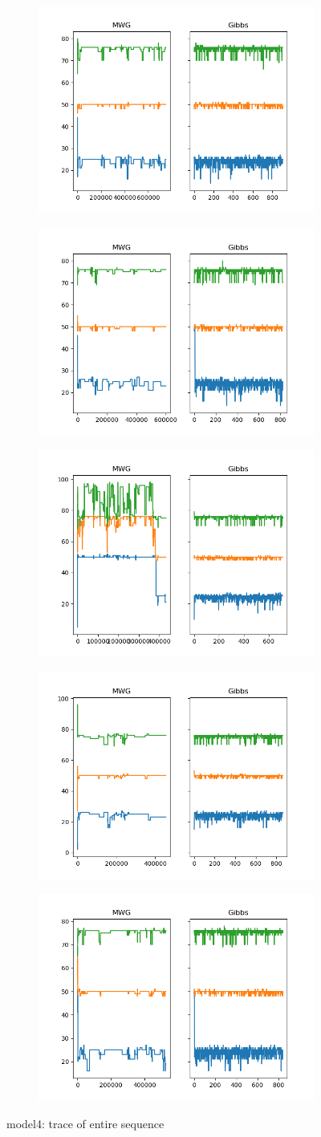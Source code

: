\begin{figure}[H]
    \centering
    \begin{subfigure}
    	\centering
        \includegraphics[width=0.3\linewidth]{../../plots/Trace_M4_N100_NMCMC3_seed0_diffind2.png}
    \end{subfigure}
    \begin{subfigure}
        \centering
    	\includegraphics[width=0.3\linewidth]{../../plots/Trace_M4_N100_NMCMC3_seed1_diffind2.png}
	\end{subfigure}
	\begin{subfigure}
	    \centering
    	\includegraphics[width=0.3\linewidth]{../../plots/Trace_M4_N100_NMCMC3_seed2_diffind2.png}
	\end{subfigure}
	\begin{subfigure}
	    \centering
    	\includegraphics[width=0.3\linewidth]{../../plots/Trace_M4_N100_NMCMC3_seed3_diffind2.png}
	\end{subfigure}
	\begin{subfigure}
	    \centering
    	\includegraphics[width=0.3\linewidth]{../../plots/Trace_M4_N100_NMCMC3_seed4_diffind2.png}
	\end{subfigure}
	\caption{model4: trace of entire sequence}
\end{figure}

